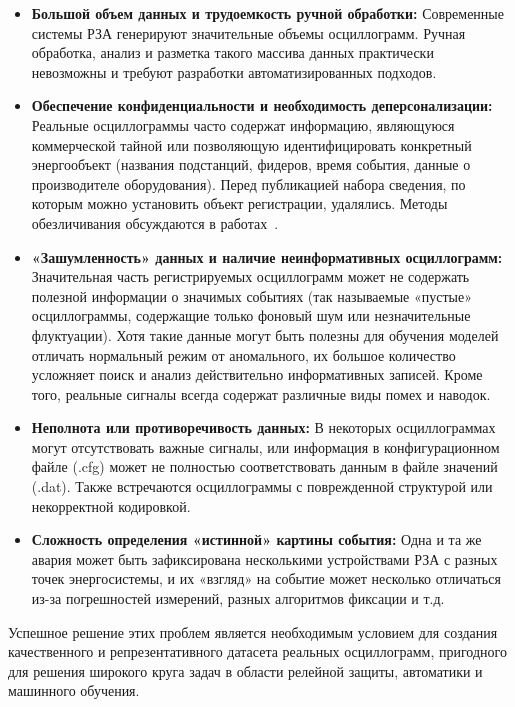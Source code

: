\begin{itemize}[itemsep=0pt,topsep=2pt]
\begin{itemize}[itemsep=0pt,topsep=2pt]
    \item Стандартные значения амплитуд (коэффициенты трансформации): Информация о коэффициентах трансформации измерительных трансформаторов тока и напряжения (или других датчиков) не всегда явно присутствует или легко извлекаема из файла осциллограммы, что усложняет процесс нормализации и приведения к первичным или стандартизированным вторичным величинам.
  \end{itemize}
  \item \textbf{Большой объем данных и трудоемкость ручной обработки:} Современные системы РЗА генерируют значительные объемы осциллограмм. Ручная обработка, анализ и разметка такого массива данных практически невозможны и требуют разработки автоматизированных подходов.
  \item \textbf{Обеспечение конфиденциальности и необходимость деперсонализации:} Реальные осциллограммы часто содержат информацию, являющуюся коммерческой тайной или позволяющую идентифицировать конкретный энергообъект (названия подстанций, фидеров, время события, данные о производителе оборудования). Перед публикацией набора сведения, по которым можно установить объект регистрации, удалялись. Методы обезличивания обсуждаются в работах~\cite{bavr_bib_092_a_2014,bavr_bib_093_l_2002}.
  \item \textbf{«Зашумленность» данных и наличие неинформативных осциллограмм:} Значительная часть регистрируемых осциллограмм может не содержать полезной информации о значимых событиях (так называемые «пустые» осциллограммы, содержащие только фоновый шум или незначительные флуктуации). Хотя такие данные могут быть полезны для обучения моделей отличать нормальный режим от аномального, их большое количество усложняет поиск и анализ действительно информативных записей. Кроме того, реальные сигналы всегда содержат различные виды помех и наводок.
  \item \textbf{Неполнота или противоречивость данных:} В некоторых осциллограммах могут отсутствовать важные сигналы, или информация в конфигурационном файле (.cfg) может не полностью соответствовать данным в файле значений (.dat). Также встречаются осциллограммы с поврежденной структурой или некорректной кодировкой.
  \item \textbf{Сложность определения «истинной» картины события:} Одна и та же авария может быть зафиксирована несколькими устройствами РЗА с разных точек энергосистемы, и их «взгляд» на событие может несколько отличаться из-за погрешностей измерений, разных алгоритмов фиксации и т.д.
\end{itemize}\par\vspace{0.2cm}

Успешное решение этих проблем является необходимым условием для создания качественного и
репрезентативного датасета реальных осциллограмм, пригодного для решения широкого круга
задач в области релейной защиты, автоматики и машинного обучения.\par\vspace{0.2cm}

